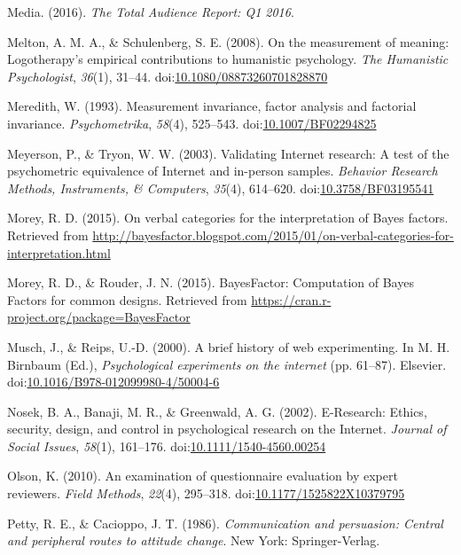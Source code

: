 \documentclass[english,man, mask]{apa6}
\theoremstyle{definition}
\theoremstyle{definition}
\theoremstyle{definition}
\theoremstyle{remark}
\begin{document}
\hypertarget{ref-Media2016}{}
Media. (2016). \emph{The Total Audience Report: Q1 2016}.

\hypertarget{ref-Melton2008}{}
Melton, A. M. A., \& Schulenberg, S. E. (2008). On the measurement of
meaning: Logotherapy's empirical contributions to humanistic psychology.
\emph{The Humanistic Psychologist}, \emph{36}(1), 31--44.
doi:\href{https://doi.org/10.1080/08873260701828870}{10.1080/08873260701828870}

\hypertarget{ref-Meredith1993}{}
Meredith, W. (1993). Measurement invariance, factor analysis and
factorial invariance. \emph{Psychometrika}, \emph{58}(4), 525--543.
doi:\href{https://doi.org/10.1007/BF02294825}{10.1007/BF02294825}

\hypertarget{ref-Meyerson2003}{}
Meyerson, P., \& Tryon, W. W. (2003). Validating Internet research: A
test of the psychometric equivalence of Internet and in-person samples.
\emph{Behavior Research Methods, Instruments, \& Computers},
\emph{35}(4), 614--620.
doi:\href{https://doi.org/10.3758/BF03195541}{10.3758/BF03195541}

\hypertarget{ref-Morey2015c}{}
Morey, R. D. (2015). On verbal categories for the interpretation of
Bayes factors. Retrieved from
\url{http://bayesfactor.blogspot.com/2015/01/on-verbal-categories-for-interpretation.html}

\hypertarget{ref-Morey2015b}{}
Morey, R. D., \& Rouder, J. N. (2015). BayesFactor: Computation of Bayes
Factors for common designs. Retrieved from
\url{https://cran.r-project.org/package=BayesFactor}

\hypertarget{ref-Musch2000}{}
Musch, J., \& Reips, U.-D. (2000). A brief history of web experimenting.
In M. H. Birnbaum (Ed.), \emph{Psychological experiments on the
internet} (pp. 61--87). Elsevier.
doi:\href{https://doi.org/10.1016/B978-012099980-4/50004-6}{10.1016/B978-012099980-4/50004-6}

\hypertarget{ref-Nosek2002}{}
Nosek, B. A., Banaji, M. R., \& Greenwald, A. G. (2002). E-Research:
Ethics, security, design, and control in psychological research on the
Internet. \emph{Journal of Social Issues}, \emph{58}(1), 161--176.
doi:\href{https://doi.org/10.1111/1540-4560.00254}{10.1111/1540-4560.00254}

\hypertarget{ref-Olson2010}{}
Olson, K. (2010). An examination of questionnaire evaluation by expert
reviewers. \emph{Field Methods}, \emph{22}(4), 295--318.
doi:\href{https://doi.org/10.1177/1525822X10379795}{10.1177/1525822X10379795}

\hypertarget{ref-Petty1986}{}
Petty, R. E., \& Cacioppo, J. T. (1986). \emph{Communication and
persuasion: Central and peripheral routes to attitude change}. New York:
Springer-Verlag.
\end{document}
